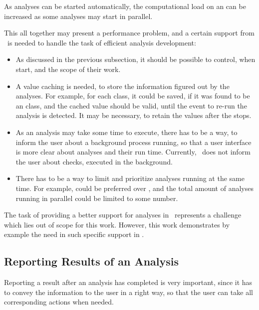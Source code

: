 As analyses can be started automatically, the computational load on an  can be increased as some analyses
may start in parallel. 

This all together may present a performance problem, and a certain support from  \jbmps\ is needed to handle the task
of efficient analysis development:

\begin{itemize}
 \item As discussed in the previous subsection, it should be possible to control, when  start,
and the scope of their work. 


\item A value caching is needed, to store the information figured out by the analyses. For example, for each
class, it could be saved, if it was found to be an  class, and the cached value should be valid, until
the event to re-run the analysis is detected. It may be necessary, to retain the values after the  stops.

 \item As an analysis may take some time to execute, there has to be a way, to inform the user about a background process
running, so that a user interface is more clear about analyses and their run time. Currently, \jbmps\ does not inform
the user about checks, executed in the background.

\item There has to be a way to limit and prioritize  analyses running at the same time. For example, 
could be preferred over , and the total amount of analyses running in parallel could be limited 
to some number.

\end{itemize}

The task of providing a better support for analyses in \jbmps\ represents a challenge which lies out of scope for this work.
However, this work demonstrates by example the need in such specific support in \jbmps.

\subsection{Reporting Results of an Analysis}
\label{reportinganalysis}

Reporting a result after an analysis has completed is very important, since it has to convey the 
information to the user in a right way, so that the user can take all corresponding actions when needed.

